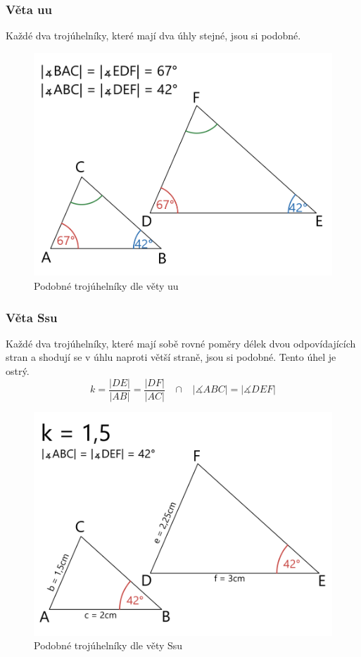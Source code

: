         \subsubsection{Věta uu}
            Každé dva trojúhelníky, které mají dva úhly stejné, jsou si podobné.\\
            
            \begin{figure}[H]
                \centering
                \includegraphics[width=0.5\linewidth]{img/23_trojuhelniky_uu.png}
                \caption{Podobné trojúhelníky dle věty uu} 
                \label{fig:enter-label}
            \end{figure}

        \subsubsection{Věta Ssu}
            Každé dva trojúhelníky, které mají sobě rovné poměry délek dvou odpovídajících stran a shodují se v úhlu naproti větší straně, jsou si podobné. Tento úhel je ostrý.
            \[k=\frac{\left| DE \right|}{\left| AB \right|}=\frac{\left| DF \right|}{\left| AC \right|} \;\;\; \cap \;\;\; \left| \measuredangle ABC\right| = \left| \measuredangle DEF \right|\]
            
            \begin{figure}[H]
                \centering
                \includegraphics[width=0.5\linewidth]{img/23_trojuhelniky_Ssu.png}
                \caption{Podobné trojúhelníky dle věty Ssu} 
                \label{fig:enter-label}
            \end{figure}
    \newpage

